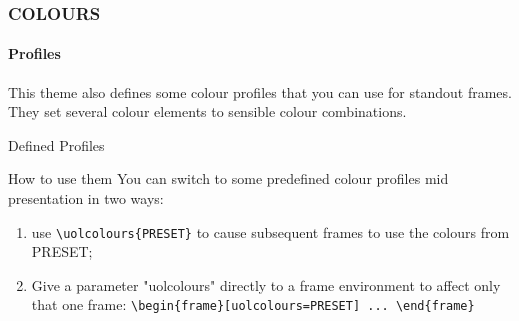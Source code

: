 \documentclass[
aspectratio=169,
]{beamer}
\begin{document}
    \begin{frame}[t,fragile]
    \frametitle{COLOURS}
    \framesubtitle{Profiles}

    This theme also defines some colour profiles that you can use for standout frames.
    They set several colour elements to sensible colour combinations.

    \begin{block}{Defined Profiles}
    \end{block}




    \begin{block}{How to use them}
 You can switch to some predefined colour profiles mid presentation in two ways:
 \begin{enumerate}
     \item use \verb|\uolcolours{PRESET}| to cause subsequent frames to use the colours from PRESET;
     \item 
         Give a parameter "uolcolours" directly to a frame environment to affect only that one frame:
         \verb|\begin{frame}[uolcolours=PRESET] ... \end{frame}|
 \end{enumerate}
    \end{block}
\end{frame}
\end{document}
